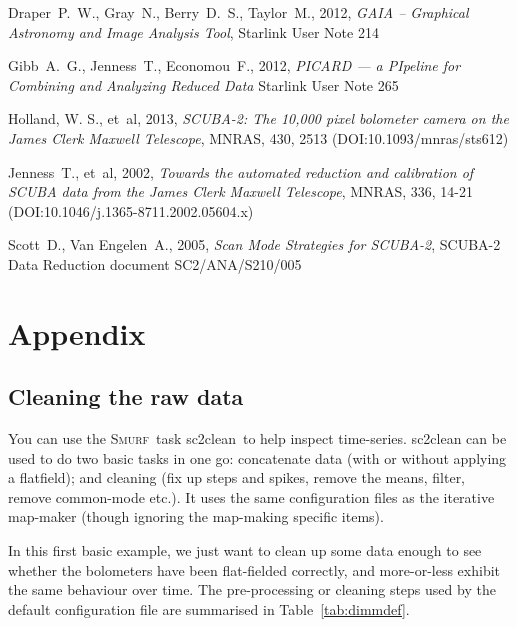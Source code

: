 \documentclass[twoside,11pt]{article}
\newcommand{\htmladdnormallink}[2]{#1}
\newcommand{\htmlref}[2]{#1}
\newcommand{\latexhtml}[2]{#1}
\newcommand{\xref}[3]{#1}
\newcommand{\xlabel}[1]{}
\renewcommand{\_}{\texttt{\symbol{95}}}
\newcommand{\smurf}{\xref{\textsc{Smurf}}{sun258}{}}
\newcommand{\task}[1]{\textsf{#1}}
\newcommand{\clean}{\xref{\task{sc2clean}}{sun258}{SC2CLEAN}}
\newcommand{\cref}[3]{\latexhtml{#1~\ref{#2}}{\htmlref{#3}{#2}}}
\begin{document}
\begin{thebibliography}{}
Draper~P.~W., Gray~N., Berry~D.~S., Taylor~M., 2012,
\textit{GAIA -- Graphical Astronomy and Image Analysis Tool},
\xref{Starlink User Note 214}{sun214}{}

Gibb~A.~G., Jenness~T., Economou~F., 2012, \textit{PICARD --- a
PIpeline for Combining and Analyzing Reduced Data}
\xref{Starlink User Note 265}{sun265}{}

Holland, W. S., et~al, 2013, \htmladdnormallink{\textit{SCUBA-2: The
10,000 pixel bolometer camera on the James Clerk Maxwell Telescope}}
{http://dx.doi.org/10.1093/mnras/sts612}, MNRAS, 430, 2513
(DOI:10.1093/mnras/sts612)

Jenness~T., et~al, 2002, \htmladdnormallink{\textit{Towards the automated
reduction and calibration of SCUBA data from the James Clerk Maxwell
Telescope}}{http://dx.doi.org/10.1046/j.1365-8711.2002.05604.x},
MNRAS, 336, 14-21 (DOI:10.1046/j.1365-8711.2002.05604.x)

Scott~D., Van Engelen~A., 2005, \htmladdnormallink{\textit{Scan Mode Strategies for
SCUBA-2}}{http://docs.jach.hawaii.edu/JCMT/SC2/ANA/S210/005/sc2_ana_s210_005.ps},
SCUBA-2 Data Reduction document SC2/ANA/S210/005

\end{thebibliography}

\newpage
\appendix
\section[Appendices]{Appendix}
\subsection{\xlabel{app_clean}Cleaning the raw data}
\label{app:clean}

You can use the \smurf\ task \clean\ to help inspect time-series.
\task{sc2clean} can be used to do two basic tasks in one go: concatenate data
(with or without applying a flatfield); and cleaning (fix up steps and
spikes, remove the means, filter, remove common-mode etc.). It uses
the same configuration files as the iterative map-maker (though
ignoring the map-making specific items).

In this first basic example, we just want to clean up some data enough
to see whether the bolometers have been flat-fielded correctly, and
more-or-less exhibit the same behaviour over time. The pre-processing
or cleaning steps used by the default configuration file are
summarised in \cref{Table}{tab:dimmdef}{this table}.
\end{document}
